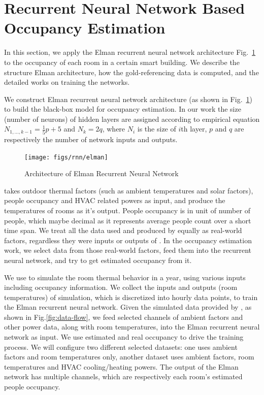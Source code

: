 \section{Recurrent Neural Network Based Occupancy Estimation}
\label{sec:rnn-method}

In this section, we apply the Elman recurrent neural network architecture
Fig.~\ref{fig:elman} to the occupancy of each room in a certain smart building.
We describe the structure Elman architecture, how the gold-referencing data is
computed, and the detailed works on training the networks.

We construct Elman recurrent neural network architecture (as shown in
Fig.~\ref{fig:elman}) to build the black-box model for occupancy estimation. In
our work the size (number of neurons) of hidden layers are assigned according
to empirical equation $N_{1,\ldots,k-1}=\frac15p+5$ and $N_k=2q$, where $N_i$
is the size of $i$th layer, $p$ and $q$ are respectively the number of network
inputs and outputs.

\begin{figure}[t]
    \centering
    \texttt{[image: figs/rnn/elman]}
    \caption{Architecture of Elman Recurrent Neural Network}
    \label{fig:elman}
\end{figure}

\EP{} takes outdoor thermal factors (such as ambient temperatures and solar
factors), people occupancy and HVAC related powers as input, and produce the
temperatures of rooms as it's output. People occupancy is in unit of number of
people, which maybe decimal as it represents average people count over a short
time span. We treat all the data used and produced by \EP{} equally as
real-world factors, regardless they were inputs or outputs of \EP{}. In the
occupancy estimation work, we select data from those real-world factors, feed
them into the recurrent neural network, and try to get estimated occupancy from
it.

We use \EP{} to simulate the room thermal behavior in a year, using various
inputs including occupancy information. We collect the inputs and outputs (room
temperatures) of \EP{} simulation, which is discretized into hourly data
points, to train the Elman recurrent neural network. Given the simulated data
provided by \EP{}, as shown in Fig.\ref{fig:data-flow}, we feed selected
channels of ambient factors and other power data, along with room temperatures,
into the Elman recurrent neural network as input. We use estimated and real
occupancy to drive the training process. We will configure two different
selected datasets: one uses ambient factors and room temperatures only, another
dataset uses ambient factors, room temperatures and HVAC cooling/heating
powers. The output of the Elman network has multiple channels, which are
respectively each room's estimated people occupancy.

